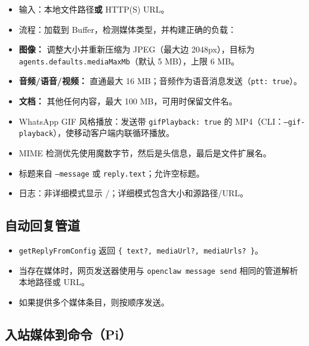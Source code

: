 \begin{itemize}
  \item 输入：本地文件路径\textbf{或} HTTP(S) URL。
  \item 流程：加载到 Buffer，检测媒体类型，并构建正确的负载：
  \item \textbf{图像：} 调整大小并重新压缩为 JPEG（最大边 2048px），目标为 \texttt{agents.defaults.mediaMaxMb}（默认 5 MB），上限 6 MB。
  \item \textbf{音频/语音/视频：} 直通最大 16 MB；音频作为语音消息发送（\texttt{ptt: true}）。
  \item \textbf{文档：} 其他任何内容，最大 100 MB，可用时保留文件名。
  \item WhatsApp GIF 风格播放：发送带 \texttt{gifPlayback: true} 的 MP4（CLI：\texttt{--gif-playback}），使移动客户端内联循环播放。
  \item MIME 检测优先使用魔数字节，然后是头信息，最后是文件扩展名。
  \item 标题来自 \texttt{--message} 或 \texttt{reply.text}；允许空标题。
  \item 日志：非详细模式显示 \texttt{}/\texttt{}；详细模式包含大小和源路径/URL。
\end{itemize}


\subsection{自动回复管道}


\begin{itemize}
  \item \texttt{getReplyFromConfig} 返回 \texttt{\{ text?, mediaUrl?, mediaUrls? \}}。
  \item 当存在媒体时，网页发送器使用与 \texttt{openclaw message send} 相同的管道解析本地路径或 URL。
  \item 如果提供多个媒体条目，则按顺序发送。
\end{itemize}


\subsection{入站媒体到命令（Pi）}


